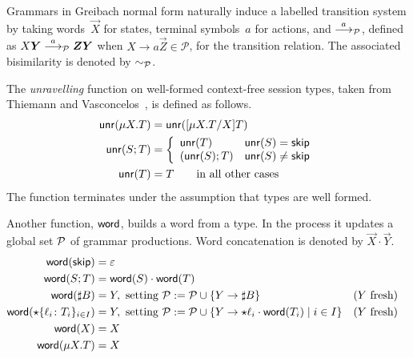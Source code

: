 
Grammars in Greibach normal form naturally induce a labelled
transition system by taking words~$\vec X$ for states, terminal
symbols~$a$ for actions, and $\stackrel{a}{\longrightarrow}_\mathcal P$, defined as
$X\vec Y\LTSderivesP \vec Z\vec Y$ when
$X \rightarrow a\vec Z \in \mathcal P$, for the transition relation.
The associated bisimilarity is denoted by $\sim_\mathcal P$.


The \emph{unravelling} function on well-formed context-free session
types, taken from Thiemann and Vasconcelos~\cite{thiemann2016context},
is defined as follows.
%
\begin{align*}
  \Unravel(\mu X.T) & = \Unravel(\subs{\mu X.T}XT)
  \\
  \Unravel (S;T) &= \left\{%
  \begin{array}{ll}
    \Unravel(T) & \Unravel(S) = \skipk
    \\
    (\Unravel(S); T) & \Unravel(S) \ne \skipk
  \end{array}
                        \right.
  \\
  \Unravel (T) &= T \qquad \text{in all other cases}
\end{align*}
%
The function terminates under the assumption that types are well
formed. 


Another function, $\mathsf{word}$, builds a word from a type. In the process it updates a
global set $\mathcal P$ of grammar productions. Word concatenation is
denoted by $\vec X\cdot\vec Y$.
%
\begin{align*}
  \mathsf{word}(\mathsf{skip}) &= \varepsilon
  \\
  \mathsf{word}(S;T) &= \mathsf{word}(S) \cdot \mathsf{word}(T)
  \\
  \mathsf{word}(\sharp B) &=
     Y,
     \text{ setting } \mathcal P := \mathcal P \cup \{Y \rightarrow \sharp B\}
    && (Y\text{ fresh})
  \\
  \mathsf{word}(\star\{\ell_i\colon T_i\}_{i\in I}) &=
     Y,
    \text{ setting } \mathcal P := \mathcal P \cup \{Y \rightarrow\star \ell_i\cdot \mathsf{word}(T_i) \mid i\in I\}
    && (Y\text{ fresh})
  \\
  \mathsf{word}(X) &= X
  \\
  \mathsf{word}(\mu X.T) &= X
\end{align*}


